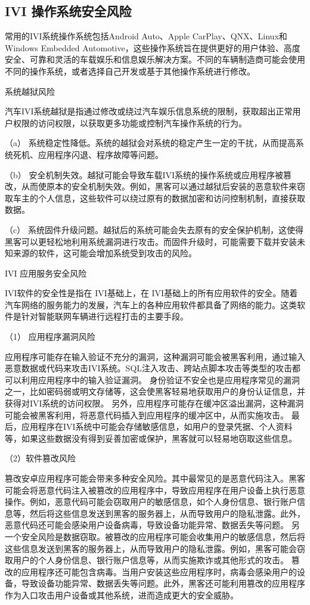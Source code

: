 \subsection{IVI 操作系统安全风险} 

常用的IVI系统操作系统包括Android Auto、Apple CarPlay、QNX、Linux和Windows Embedded Automotive，这些操作系统旨在提供更好的用户体验、高度安全、可靠和灵活的车载娱乐和信息娱乐解决方案。不同的车辆制造商可能会使用不同的操作系统，或者选择自己开发或基于其他操作系统进行修改。

系统越狱风险   

汽车IVI系统越狱是指通过修改或绕过汽车娱乐信息系统的限制，获取超出正常用户权限的访问权限，以获取更多功能或控制汽车操作系统的行为。

（a） 系统稳定性降低。系统的越狱会对系统的稳定产生一定的干扰，从而提高系统死机、应用程序闪退、程序故障等问题。

（b） 安全机制失效。越狱可能会导致车载IVI系统的操作系统或应用程序被篡改，从而使原本的安全机制失效。例如，黑客可以通过越狱后安装的恶意软件来窃取车主的个人信息，这些软件可以绕过原有的数据加密和访问控制机制，直接获取数据。

（c） 系统固件升级问题。越狱后的系统可能会失去原有的安全保护机制，这使得黑客可以更轻松地利用系统漏洞进行攻击。而固件升级时，可能需要下载并安装未知来源的软件，这可能会增加系统受到攻击的风险。

IVI 应用服务安全风险 

IVI软件的安全性是指在 IVI基础上，在 IVI基础上的所有应用软件的安全。随着汽车网络的服务能力的发展，汽车上的各种应用软件都具备了网络的能力。这类软件是针对智能联网车辆进行远程打击的主要手段。

（1） 应用程序漏洞风险 

应用程序可能存在输入验证不充分的漏洞，这种漏洞可能会被黑客利用，通过输入恶意数据或代码来攻击IVI系统。SQL注入攻击、跨站点脚本攻击等类型的攻击都可以利用应用程序中的输入验证漏洞。
身份验证不安全也是应用程序常见的漏洞之一，比如密码弱或明文存储等，这会使黑客轻易地获取用户的身份认证信息，并获得对IVI系统的访问权限。
另外，应用程序可能存在缓冲区溢出漏洞，这种漏洞可能会被黑客利用，将恶意代码插入到应用程序的缓冲区中，从而实施攻击。
最后，应用程序在IVI系统中可能会存储敏感信息，如用户的登录凭据、个人资料等，如果这些数据没有得到妥善加密或保护，黑客就可以轻易地窃取这些信息。

（2）软件篡改风险 

篡改安卓应用程序可能会带来多种安全风险。其中最常见的是恶意代码注入。黑客可能会将恶意代码注入被篡改的应用程序中，导致应用程序在用户设备上执行恶意操作。例如，恶意代码可能会窃取用户的敏感信息，如个人身份信息、银行账户信息等，然后将这些信息发送到黑客的服务器上，从而导致用户的隐私泄露。此外，恶意代码还可能会感染用户设备病毒，导致设备功能异常、数据丢失等问题。
另一个安全风险是数据窃取。被篡改的应用程序可能会收集用户的敏感信息，然后将这些信息发送到黑客的服务器上，从而导致用户的隐私泄露。例如，黑客可能会窃取用户的个人身份信息、银行账户信息等，从而实施欺诈或其他形式的攻击。
篡改的应用程序还可能包含病毒。当用户安装这些应用程序时，病毒会感染用户的设备，导致设备功能异常、数据丢失等问题。此外，黑客还可能利用篡改的应用程序作为入口攻击用户设备或其他系统，进而造成更大的安全威胁。

